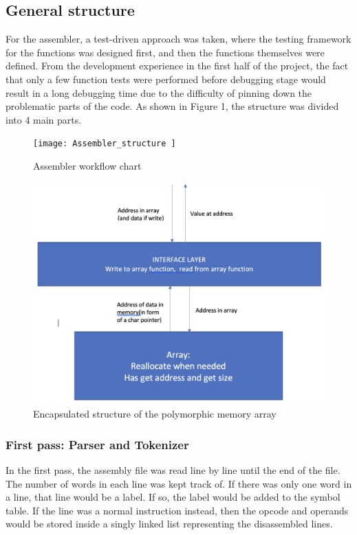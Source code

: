 \documentclass[10pt]{article}
\begin{document}
\subsection{General structure}
For the assembler, a test-driven approach was taken, where the testing framework for the functions was designed first, and then the functions themselves were defined. From the development experience in the first half of the project, the fact that only a few function tests were performed before debugging stage would result in a long debugging time due to the difficulty of pinning down the problematic parts of the code.
As shown in Figure 1, the structure was divided into 4 main parts.
\begin{figure}
\centering
\begin{minipage}{.5\textwidth}
\centering
\texttt{[image:  Assembler\_structure ]}
\caption{Assembler workflow chart}
\label{fig:Assembler_structure}
\end{minipage}\hfill
\begin{minipage}{.5\textwidth}
\centering
\includegraphics[width = \linewidth]{ mem_array }
\caption{Encapsulated structure of the polymorphic memory array}
\label{fig:mem_array}
\end{minipage}
\end{figure}

\subsubsection{First pass: Parser and Tokenizer}
In the first pass, the assembly file was read line by line until the end of the file. The number of words in each line was kept track of. If there was only one word in a line, that line would be a label. If so, the label would be added to the symbol table. If the line was a normal instruction instead, then the opcode and operands would be stored inside a singly linked list representing the disassembled lines.
\end{document}
